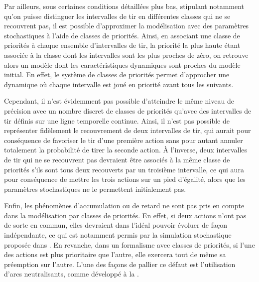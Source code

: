Par ailleurs, sous certaines conditions détaillées plus bas,
stipulant notamment qu'on puisse distinguer les intervalles de tir en différentes classes
qui ne se recouvrent pas,
il est possible d'approximer la modélisation avec des paramètres stochastiques à
l'aide de classes de priorités.
Ainsi, en associant une classe de priorités à chaque ensemble d'intervalles de tir,
la priorité la plus haute étant associée à la classe dont les intervalles sont les plus proches
de zéro,
on retrouve alors un modèle dont les caractéristiques dynamiques sont proches
du modèle initial.
En effet, le système de classes de priorités permet d'approcher une dynamique où
chaque intervalle est joué en priorité avant tous les suivants.

Cependant, il n'est évidemment pas possible d'atteindre le même niveau de précision avec un nombre
discret de classes de priorités qu'avec des intervalles de tir définis sur une ligne temporelle
continue.
Ainsi, il n'est pas possible de représenter fidèlement le recouvrement de deux intervalles de tir,
qui aurait pour conséquence de favoriser le tir d'une première action sans pour autant annuler
totalement la probabilité de tirer la seconde action.
À l'inverse, deux intervalles de tir qui ne se recouvrent pas devraient être associés à la même
classe de priorités s'ils sont tous deux recouverts par un troisième intervalle,
ce qui aura pour conséquence de mettre les trois actions sur un pied d'égalité, alors que les
paramètres stochastiques ne le permettent initialement pas.

Enfin, les phénomènes d'accumulation ou de retard ne sont pas pris en compte dans la modélisation
par classes de priorités.
En effet, si deux actions n'ont pas de sorte en commun, elles devraient dans l'idéal pouvoir
évoluer de façon indépendante, ce qui est notamment permis par la simulation stochastique
proposée dans .
En revanche, dans un formalisme avec classes de priorités, si l'une des actions est plus
prioritaire que l'autre, elle exercera tout de même sa préemption sur l'autre.
L'une des façons de pallier ce défaut est l'utilisation d'arcs neutralisants,
comme développé à la .


